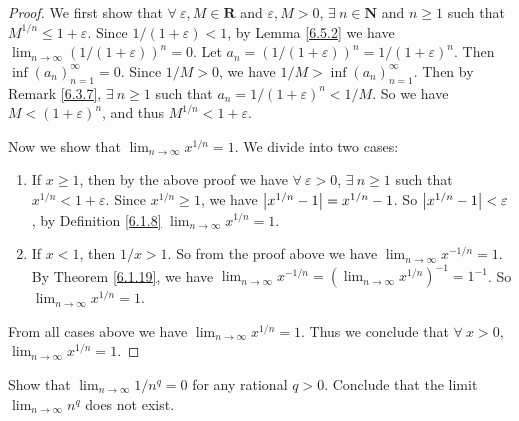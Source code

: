\begin{proof}
We first show that \(\forall\ \varepsilon, M \in \mathbf{R}\) and \(\varepsilon, M > 0\), \(\exists\ n \in \mathbf{N}\) and \(n \geq 1\) such that \(M^{1 / n} \leq 1 + \varepsilon\).
Since \(1 / (1 + \varepsilon) < 1\), by Lemma \ref{6.5.2} we have \(\lim_{n \to \infty} (1 / (1 + \varepsilon))^n = 0\).
Let \(a_n = (1 / (1 + \varepsilon))^n = 1 / (1 + \varepsilon)^n\).
Then \(\inf(a_n)_{n = 1}^\infty = 0\).
Since \(1 / M > 0\), we have \(1 / M > \inf(a_n)_{n = 1}^\infty\).
Then by Remark \ref{6.3.7}, \(\exists\ n \geq 1\) such that \(a_n = 1 / (1 + \varepsilon)^n < 1 / M\).
So we have \(M < (1 + \varepsilon)^n\), and thus \(M^{1 / n} < 1 + \varepsilon\).

Now we show that \(\lim_{n \to \infty} x^{1 / n} = 1\).
We divide into two cases:
\begin{enumerate}
    \item If \(x \geq 1\), then by the above proof we have \(\forall\ \varepsilon > 0\), \(\exists\ n \geq 1\) such that \(x^{1 / n} < 1 + \varepsilon\).
    Since \(x^{1 / n} \geq 1\), we have \(\abs*{x^{1 / n} - 1} = x^{1 / n} - 1\).
    So \(\abs*{x^{1 / n} - 1} < \varepsilon\), by Definition \ref{6.1.8} \(\lim_{n \to \infty} x^{1 / n} = 1\).
    \item If \(x < 1\), then \(1 / x > 1\).
    So from the proof above we have \(\lim_{n \to \infty} x^{-1 / n} = 1\).
    By Theorem \ref{6.1.19}, we have \(\lim_{n \to \infty} x^{-1 / n} = (\lim_{n \to \infty} x^{1 / n})^{-1} = 1^{-1}\).
    So \(\lim_{n \to \infty} x^{1 / n} = 1\).
\end{enumerate}
From all cases above we have \(\lim_{n \to \infty} x^{1 / n} = 1\).
Thus we conclude that \(\forall\ x > 0\), \(\lim_{n \to \infty} x^{1 / n} = 1\).
\end{proof}

\exercisesection

\begin{exercise}\label{ex 6.5.1}
Show that \(\lim_{n \to \infty} 1 / n^q = 0\) for any rational \(q > 0\).
Conclude that the limit \(\lim_{n \to \infty} n^q\) does not exist.
\end{exercise}

